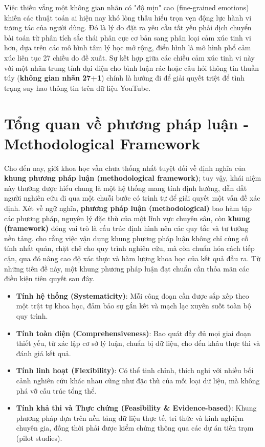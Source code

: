 Việc thiếu vắng một không gian nhãn có "độ mịn" cao (fine-grained emotions) khiến các thuật toán \gls{ai} hiện nay khó lòng thấu hiểu trọn vẹn động lực hành vi tương tác của người dùng. Đó là lý do đặt ra yêu cầu tất yếu phải dịch chuyển bài toán từ phân tích sắc thái phân cực cơ bản sang phân loại cảm xúc tinh vi hơn, dựa trên các mô hình tâm lý học mở rộng, điển hình là mô hình phổ cảm xúc liên tục 27 chiều do \textcite{demszky2020goemotions} đề xuất. Sự kết hợp giữa các chiều cảm xúc tinh vi này với một nhãn trung tính đại diện cho bình luận rác hoặc câu hỏi thông tin thuần túy (\textbf{không gian nhãn 27+1}) chính là hướng đi để giải quyết triệt để tình trạng suy hao thông tin trên dữ liệu YouTube.

\section{Tổng quan về phương pháp luận - Methodological Framework}
\label{sec:methodological_framework}
Cho đến nay, giới khoa học vẫn chưa thống nhất tuyệt đối về định nghĩa của \textbf{khung phương pháp luận (methodological framework)}; tuy vậy, khái niệm này thường được hiểu chung là một hệ thống mang tính định hướng, dẫn dắt người nghiên cứu đi qua một chuỗi bước có trình tự để giải quyết một vấn đề xác định. Xét về ngữ nghĩa, \textbf{phương pháp luận (methodological)} bao hàm tập các phương pháp, nguyên lý đặc thù của một lĩnh vực chuyên sâu, còn \textbf{khung (framework)} đóng vai trò là cấu trúc định hình nên các quy tắc và tư tưởng nền tảng. \textcite{mcmeekin2020methodological} cho rằng việc vận dụng khung phương pháp luận không chỉ củng cố tính nhất quán, chặt chẽ cho quy trình nghiên cứu, mà còn chuẩn hóa cách tiếp cận, qua đó nâng cao độ xác thực và hàm lượng khoa học của kết quả đầu ra.
Từ những tiền đề này, một khung phương pháp luận đạt chuẩn cần thỏa mãn các điều kiện tiên quyết sau đây.

\begin{itemize}
    \item \textbf{Tính hệ thống (Systematicity)}: Mỗi công đoạn cần được sắp xếp theo một trật tự khoa học, đảm bảo sự gắn kết và mạch lạc xuyên suốt toàn bộ quy trình.
    \item \textbf{Tính toàn diện (Comprehensiveness)}: Bao quát đầy đủ mọi giai đoạn thiết yếu, từ xác lập cơ sở lý luận, chuẩn bị dữ liệu, cho đến khâu thực thi và đánh giá kết quả.
    \item \textbf{Tính linh hoạt (Flexibility)}: Có thể tinh chỉnh, thích nghi với nhiều bối cảnh nghiên cứu khác nhau cũng như đặc thù của mỗi loại dữ liệu, mà không phá vỡ cấu trúc tổng thể.
    \item \textbf{Tính khả thi và Thực chứng (Feasibility \& Evidence-based)}: Khung phương pháp dựa trên nền tảng dữ liệu thực tế, tri thức và kinh nghiệm chuyên gia, đồng thời phải được kiểm chứng thông qua các dự án tiền trạm (pilot studies).
\end{itemize}

